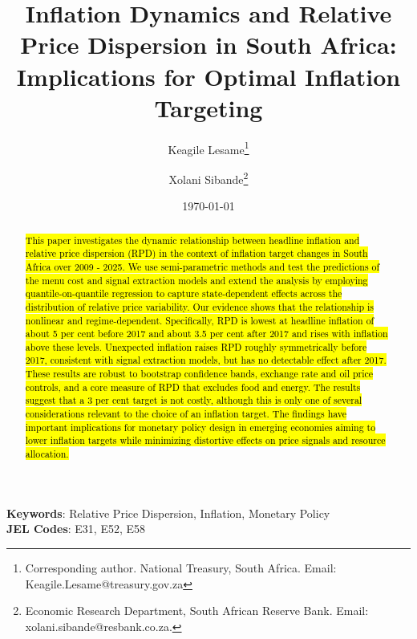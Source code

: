 \title{Inflation Dynamics and Relative Price Dispersion in South Africa: Implications for Optimal Inflation Targeting}
\author {Keagile Lesame\footnote{Corresponding author. National Treasury, South Africa. Email: Keagile.Lesame@treasury.gov.za} \and
Xolani Sibande\footnote{Economic Research Department, South African Reserve Bank. Email: xolani.sibande@resbank.co.za.}}


\date{\today}
\maketitle


\begin{abstract}

\hl{This paper investigates the dynamic relationship between headline inflation and relative price dispersion (RPD) in the context of inflation target changes in South Africa over 2009 - 2025. We use semi-parametric methods and test the predictions of the menu cost and signal extraction models and extend the analysis by employing quantile-on-quantile regression to capture state-dependent effects across the distribution of relative price variability. Our evidence shows that the relationship is nonlinear and regime-dependent. Specifically, RPD is lowest at headline inflation of about 5 per cent before 2017 and about 3.5 per cent after 2017 and rises with inflation above these levels. Unexpected inflation raises RPD roughly symmetrically before 2017, consistent with signal extraction models, but has no detectable effect after 2017. These results are robust to bootstrap confidence bands, exchange rate and oil price controls, and a core measure of RPD that excludes food and energy. The results suggest that a 3 per cent target is not costly, although this is only one of several considerations relevant to the choice of an inflation target. The findings have important implications for monetary policy design in emerging economies aiming to lower inflation targets while minimizing distortive effects on price signals and resource allocation.}

\end{abstract}

\noindent\textbf{Keywords}: Relative Price Dispersion, Inflation, Monetary Policy\\
\textbf{JEL Codes}: E31, E52, E58
\newpage
